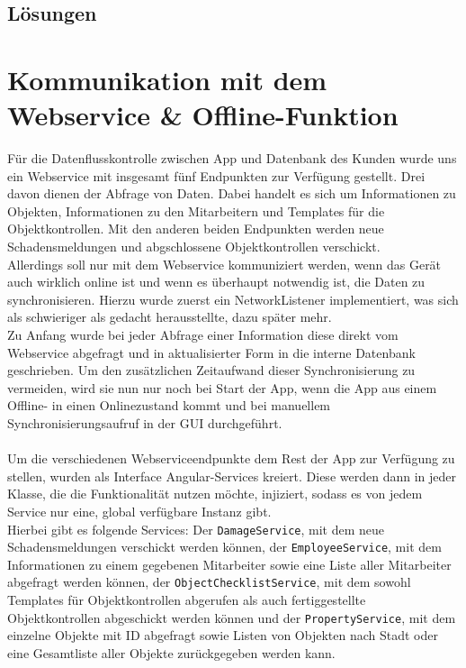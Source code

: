 \documentclass[12pt]{article}
\begin{document}
\subsection{Lösungen}

\section{Kommunikation mit dem Webservice \& Offline-Funktion}
Für die Datenflusskontrolle zwischen App und Datenbank des Kunden wurde uns ein Webservice mit insgesamt fünf Endpunkten zur Verfügung gestellt. Drei davon dienen der Abfrage von Daten. Dabei handelt es sich um Informationen zu Objekten, Informationen zu den Mitarbeitern und Templates für die Objektkontrollen. Mit den anderen beiden Endpunkten werden neue Schadensmeldungen und abgschlossene Objektkontrollen verschickt.\\
Allerdings soll nur mit dem Webservice kommuniziert werden, wenn das Gerät auch wirklich online ist und wenn es überhaupt notwendig ist, die Daten zu synchronisieren. Hierzu wurde zuerst ein NetworkListener implementiert, was sich als schwieriger als gedacht herausstellte, dazu später mehr.\\
Zu Anfang wurde bei jeder Abfrage einer Information diese direkt vom Webservice abgefragt und in aktualisierter Form in die interne Datenbank geschrieben. Um den zusätzlichen Zeitaufwand dieser Synchronisierung zu vermeiden, wird sie nun nur noch bei Start der App, wenn die App aus einem Offline- in einen Onlinezustand kommt und bei manuellem Synchronisierungsaufruf in der GUI durchgeführt. 

\paragraph{}Um die verschiedenen Webserviceendpunkte dem Rest der App zur Verfügung zu stellen, wurden als Interface Angular-Services kreiert. Diese werden dann in jeder Klasse, die die Funktionalität nutzen möchte, injiziert, sodass es von jedem Service nur eine, global verfügbare Instanz gibt.\\
Hierbei gibt es folgende Services: Der \texttt{DamageService}, mit dem neue Schadensmeldungen verschickt werden können, der \texttt{EmployeeService}, mit dem Informationen zu einem gegebenen Mitarbeiter sowie eine Liste aller Mitarbeiter abgefragt werden können, der \texttt{ObjectChecklistService}, mit dem sowohl Templates für Objektkontrollen abgerufen als auch fertiggestellte Objektkontrollen abgeschickt werden können und der \texttt{PropertyService}, mit dem einzelne Objekte mit ID abgefragt sowie Listen von Objekten nach Stadt oder eine Gesamtliste aller Objekte zurückgegeben werden kann.
\end{document}

